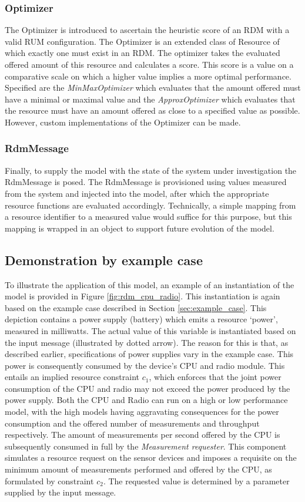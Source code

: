 \subsubsection{Optimizer}
The Optimizer is introduced to ascertain the heuristic score of an RDM with a valid RUM configuration. The Optimizer is an extended class of Resource of which exactly one must exist in an RDM. The optimizer takes the evaluated offered amount of this resource and calculates a score. This score is a value on a comparative scale on which a higher value implies a more optimal performance. Specified are the \emph{MinMaxOptimizer} which evaluates that the amount offered must have a minimal or maximal value and the \emph{ApproxOptimizer} which evaluates that the resource must have an amount offered as close to a specified value as possible. However, custom implementations of the Optimizer can be made.

\subsubsection{RdmMessage}
Finally, to supply the model with the state of the system under investigation the RdmMessage is posed. The RdmMessage is provisioned using values measured from the system and injected into the model, after which the appropriate resource functions are evaluated accordingly. Technically, a simple mapping from a resource identifier to a measured value would suffice for this purpose, but this mapping is wrapped in an object to support future evolution of the model.

\subsection{Demonstration by example case}
To illustrate the application of this model, an example of an instantiation of the model is provided in Figure \ref{fig:rdm_cpu_radio}. This instantiation is again based on the example case described in Section \ref{sec:example_case}. This depiction contains a power supply (battery) which emits a resource `power', measured in milliwatts. The actual value of this variable is instantiated based on the input message (illustrated by dotted arrow). The reason for this is that, as described earlier, specifications of power supplies vary in the example case. This power is consequently consumed by the device's CPU and radio module. This entails an implied resource constraint $c_1$, which enforces that the joint power consumption of the CPU and radio may not exceed the power produced by the power supply. Both the CPU and Radio can run on a high or low performance model, with the high models having aggravating consequences for the power consumption and the offered number of measurements and throughput respectively. The amount of measurements per second offered by the CPU is subsequently consumed in full by the \emph{Measurement requester}. This component simulates a resource request on the sensor devices and imposes a requisite on the minimum amount of measurements performed and offered by the CPU, as formulated by constraint $c_2$. The requested value is determined by a parameter supplied by the input message. 

